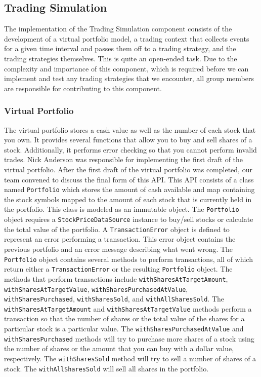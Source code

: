 \subsection{Trading Simulation}

The implementation of the Trading Simulation component consists of the development of a virtual portfolio model, a trading context that collects events for a given time interval and passes them off to a trading strategy, and the trading strategies themselves.
This is quite an open-ended task.
Due to the complexity and importance of this component, which is required before we can implement and test any trading strategies that we encounter, all group members are responsible for contributing to this component.

\subsubsection{Virtual Portfolio}

The virtual portfolio stores a cash value as well as the number of each stock that you own.
It provides several functions that allow you to buy and sell shares of a stock.
Additionally, it performs error checking so that you cannot perform invalid trades.
Nick Anderson was responsible for implementing the first draft of the virtual portfolio.
After the first draft of the virtual portfolio was completed, our team convened to discuss the final form of this API.
This API consists of a class named \texttt{Portfolio} which stores the amount of cash available and map containing the stock symbols mapped to the amount of each stock that is currently held in the portfolio.
This class is modeled as an immutable object.
The \texttt{Portfolio} object requires a \texttt{StockPriceDataSource} instance to buy/sell stocks or calculate the total value of the portfolio.
A \texttt{TransactionError} object is defined to represent an error performing a transaction.
This error object contains the previous portfolio and an error message describing what went wrong.
The \texttt{Portfolio} object contains several methods to perform transactions, all of which return either a \texttt{TransactionError} or the resulting \texttt{Portfolio} object.
The methods that perform transactions include \texttt{withSharesAtTargetAmount}, \texttt{withSharesAtTargetValue}, \texttt{withSharesPurchasedAtValue}, \texttt{withSharesPurchased}, \texttt{withSharesSold}, and \texttt{withAllSharesSold}.
The \texttt{withSharesAtTargetAmount} and \texttt{withSharesAtTargetValue} methods perform a transaction so that the number of shares or the total value of the shares for a particular stock is a particular value.
The \texttt{withSharesPurchasedAtValue} and \texttt{withSharesPurchased} methods will try to purchase more shares of a stock using the number of shares or the amount that you can buy with a dollar value, respectively.
The \texttt{withSharesSold} method will try to sell a number of shares of a stock.
The \texttt{withAllSharesSold} will sell all shares in the portfolio.
 
